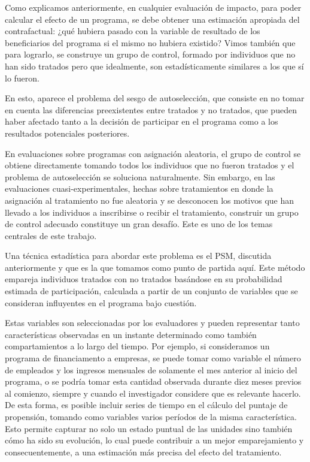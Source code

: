 \documentclass[../main.tex]{subfiles}
\begin{document}
Como explicamos anteriormente, en cualquier evaluación de impacto, para poder calcular el
efecto de un programa, se debe obtener una estimación apropiada del contrafactual: ¿qué
hubiera pasado con la variable de resultado de los beneficiarios del programa si el mismo
no hubiera existido? Vimos también que para lograrlo, se construye un grupo de control,
formado por individuos que no han sido tratados pero que idealmente, son estadísticamente
similares a los que sí lo fueron.

En esto, aparece el problema del sesgo de autoselección, que consiste en no tomar en
cuenta las diferencias preexistentes entre tratados y no tratados, que pueden haber
afectado tanto a la decisión de participar en el programa como a los resultados
potenciales posteriores.

En evaluaciones sobre programas con asignación aleatoria, el grupo de control se obtiene
directamente tomando todos los individuos que no fueron tratados y el problema de
autoselección se soluciona naturalmente. Sin embargo, en las evaluaciones
cuasi-experimentales, hechas sobre tratamientos en donde la asignación al tratamiento no
fue aleatoria y se desconocen los motivos que han llevado a los individuos a inscribirse o
recibir el tratamiento, construir un grupo de control adecuado constituye un gran desafío.
Este es uno de los temas centrales de este trabajo.

Una técnica estadística para abordar este problema es el PSM, discutida anteriormente y
que es la que tomamos como punto de partida aquí. Este método empareja individuos tratados
con no tratados basándose en su probabilidad estimada de participación, calculada a partir
de un conjunto de variables que se consideran influyentes en el programa bajo cuestión.

Estas variables son seleccionadas por los evaluadores y pueden representar tanto
características observadas en un instante determinado como también compartamientos a lo
largo del tiempo. Por ejemplo, si consideramos un programa de financiamento a empresas, se
puede tomar como variable el número de empleados y los ingresos mensuales de solamente el
mes anterior al inicio del programa, o se podría tomar esta cantidad observada durante
diez meses previos al comienzo, siempre y cuando el investigador considere que es
relevante hacerlo. De esta forma, es posible incluir series de tiempo en el cálculo del
puntaje de propensión, tomando como variables varios períodos de la misma característica.
Esto permite capturar no solo un estado puntual de las unidades sino también cómo ha sido
su evolución, lo cual puede contribuir a un mejor emparejamiento y consecuentemente, a una
estimación más precisa del efecto del tratamiento.
\end{document}
